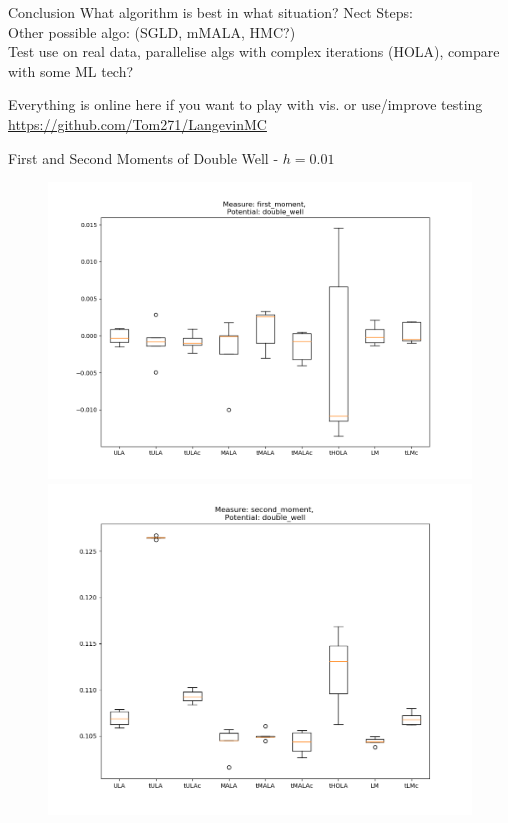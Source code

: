 \documentclass[aspectratio=169]{beamer}
\begin{document}
\begin{frame}{Conclusion}
    What algorithm is best in what situation?
    Nect Steps:\\
    Other possible algo: (SGLD, mMALA, HMC?)\\
    Test use on real data, parallelise algs with complex iterations (HOLA), compare with some ML tech?
    
\end{frame}
\begin{frame}{}
    Everything is online here if you want to play with vis. or use/improve testing
    \url{https://github.com/Tom271/LangevinMC}
\end{frame}
\begin{frame}{First and Second Moments of Double Well - \(h=0.01\)}%
        \begin{figure}[h]
        \centering
        \begin{minipage}{0.5\linewidth}
          \centering
          \includegraphics[width=0.99\linewidth]{10sBoxPlot1moment100dim001step.png}
        \end{minipage}%
        \begin{minipage}{0.5\linewidth}
          \centering
          \includegraphics[width=0.99\linewidth]{10sBoxPlot2moment100dim001step.png}
        \end{minipage}%
        \end{figure}
\end{frame}
\end{document}

